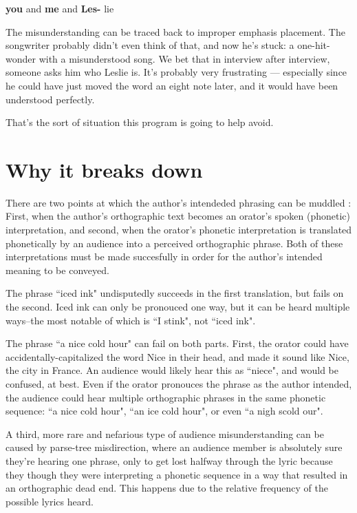 \begin{center}
{\large \textbf{you }}{\large and }{\large \textbf{me }}{\large and }{\large \textbf{Les- 
}}{\large lie}
\end{center}

The misunderstanding can be traced back to improper emphasis placement. The songwriter probably didn't even think of that, and now he's stuck: a one-hit-wonder with a misunderstood song. We bet that in interview after interview, someone asks him who Leslie is. It's probably very frustrating --- especially since he could have just moved the word an eight note later, and it would have been understood perfectly.

That's the sort of situation this program is going to help avoid.



\section{ Why it breaks down }
\label{sect:whyItBreaksDown}

There are two points at which the author's intendeded phrasing can be muddled : First, when the author's orthographic text becomes an orator's spoken (phonetic) interpretation, and second, when the orator's phonetic interpretation is translated phonetically by an audience into a perceived orthographic phrase. Both of these interpretations must be made succesfully in order for the author's intended meaning to be conveyed.


The phrase ``iced ink" undisputedly succeeds in the first translation, but fails on the second.  Iced ink can only be pronouced one way, but it can be heard multiple ways--the most notable of which is ``I stink", not ``iced ink".

The phrase ``a nice cold hour" can fail on both parts.  First, the orator could have accidentally-capitalized the word Nice in their head, and made it sound like Nice, the city in France.  An audience would likely hear this as ``niece", and would be confused, at best.  Even if the orator pronouces the phrase as the author intended, the audience could hear multiple orthographic phrases in the same phonetic sequence: ``a nice cold hour", ``an ice cold hour", or even ``a nigh scold our".

A third, more rare and nefarious type of audience misunderstanding can be caused by parse-tree misdirection, where an audience member is absolutely sure they're hearing one phrase, only to get lost halfway through the lyric because they though they were interpreting a phonetic sequence in a way that resulted in an orthographic dead end. This happens due to the relative frequency of the possible lyrics heard.

